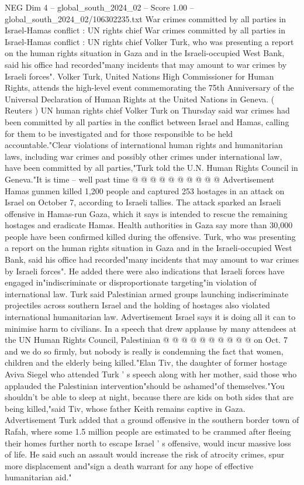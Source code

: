 \begin{textsample}{NEG Dim 4 – global\_south\_2024\_02 – Score 1.00 – global\_south\_2024\_02/106302235.txt}  \label{ex:f4_neg_384}
War crimes committed by all parties in Israel-Hamas conflict : UN rights chief War crimes committed by all parties in Israel-Hamas conflict : UN rights chief Volker Turk, who was presenting a report on the human rights situation in Gaza and in the Israeli-occupied West Bank, said his office had recorded"many incidents that may amount to war crimes by Israeli forces".
Volker Turk, United Nations High Commissioner for Human Rights, attends the high-level event commemorating the 75th Anniversary of the Universal Declaration of Human Rights at the United Nations in Geneva. ( Reuters ) UN human rights chief Volker Turk on Thursday said war crimes had been committed by all parties in the conflict between Israel and Hamas, calling for them to be investigated and for those responsible to be held accountable."Clear violations of international human rights and humanitarian laws, including war crimes and possibly other crimes under international law, have been committed by all parties,"Turk told the U.N.
Human Rights Council in Geneva."It is time -- well past time @ @ @ @ @ @ @ @ @ @ Advertisement Hamas gunmen killed 1,200 people and captured 253 hostages in an attack on Israel on October 7, according to Israeli tallies.
The attack sparked an Israeli offensive in Hamas-run Gaza, which it says is intended to rescue the remaining hostages and eradicate Hamas.
Health authorities in Gaza say more than 30,000 people have been confirmed killed during the offensive.
Turk, who was presenting a report on the human rights situation in Gaza and in the Israeli-occupied West Bank, said his office had recorded"many incidents that may amount to war crimes by Israeli forces".
He added there were also indications that Israeli forces have engaged in"indiscriminate or disproportionate targeting"in violation of international law.
Turk said Palestinian armed groups launching indiscriminate projectiles across southern Israel and the holding of hostages also violated international humanitarian law.
Advertisement Israel says it is doing all it can to minimise harm to civilians.
In a speech that drew applause by many attendees at the UN Human Rights Council, Palestinian @ @ @ @ @ @ @ @ @ @ on Oct. 7 and we do so firmly, but nobody is really is condemning the fact that women, children and the elderly being killed."Elan Tiv, the daughter of former hostage Aviva Siegel who attended Turk ' s speech along with her mother, said those who applauded the Palestinian intervention"should be ashamed"of themselves."You shouldn't be able to sleep at night, because there are kids on both sides that are being killed,"said Tiv, whose father Keith remains captive in Gaza.
Advertisement Turk added that a ground offensive in the southern border town of Rafah, where some 1.5 million people are estimated to be crammed after fleeing their homes further north to escape Israel ' s offensive, would incur massive loss of life.
He said such an assault would increase the risk of atrocity crimes, spur more displacement and"sign a death warrant for any hope of effective humanitarian aid."

\end{textsample}
